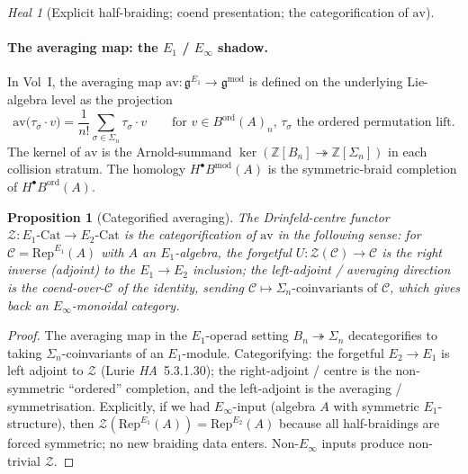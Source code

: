 \documentclass[11pt]{article}
\newtheorem{prop}[thm]{Proposition}
\theoremstyle{definition}
\theoremstyle{remark}
\newtheorem{heal}[thm]{Heal}
\newcommand{\bZ}{\mathbb{Z}}
\newcommand{\cC}{\mathcal{C}}
\newcommand{\cZ}{\mathcal{Z}}
\newcommand{\fg}{\mathfrak{g}}
\newcommand{\Rep}{\mathrm{Rep}}
\newcommand{\Eone}{E_1}
\newcommand{\Etwo}{E_2}
\newcommand{\Einf}{E_\infty}
\newcommand{\ord}{\mathrm{ord}}
\newcommand{\av}{\mathrm{av}}
\begin{document}
\begin{heal}[Explicit half-braiding; coend presentation; the
categorification of $\av$]
\paragraph{The averaging map: the $\Eone$ / $\Einf$ shadow.}
In Vol~I, the averaging map $\av\colon \fg^{\Eone} \to
\fg^{\mathrm{mod}}$ is defined on the underlying Lie-algebra level
as the projection
\[
\av\bigl(\tau_\sigma \cdot v\bigr) = \frac{1}{n!} \sum_{\sigma \in \Sigma_n} \tau_\sigma \cdot v
\qquad
\text{for $v \in B^{\ord}(A)_n$, $\tau_\sigma$ the ordered
permutation lift.}
\]
The kernel of $\av$ is the Arnold-summand
$\ker(\bZ[B_n] \twoheadrightarrow \bZ[\Sigma_n])$ in each
collision stratum. The homology $H^\bullet B^{\mathrm{mod}}(A)$
is the symmetric-braid completion of $H^\bullet B^{\ord}(A)$.

\begin{prop}[Categorified averaging]
\label{prop:cat-av}
The Drinfeld-centre functor
$\cZ\colon \Eone\text{-}\mathrm{Cat} \to \Etwo\text{-}\mathrm{Cat}$
is the categorification of $\av$ in the following sense: for
$\cC = \Rep^{\Eone}(A)$ with $A$ an $\Eone$-algebra, the forgetful
$U\colon \cZ(\cC) \to \cC$ is the \emph{right} inverse (adjoint)
to the $\Eone \to \Etwo$ inclusion; the left-adjoint / averaging
direction is the coend-over-$\cC$ of the identity, sending
$\cC \mapsto \Sigma_n\text{-coinvariants of }\cC$, which gives
back an $\Einf$-monoidal category.
\end{prop}

\begin{proof}
The averaging map in the $\Eone$-operad setting
$B_n \twoheadrightarrow \Sigma_n$ decategorifies to taking
$\Sigma_n$-coinvariants of an $\Eone$-module. Categorifying:
the forgetful $\Etwo \to \Eone$ is left adjoint to $\cZ$ (Lurie
\emph{HA}~5.3.1.30); the right-adjoint / centre is the
non-symmetric ``ordered'' completion, and the left-adjoint is the
averaging / symmetrisation. Explicitly, if we had $\Einf$-input
(algebra $A$ with symmetric $\Eone$-structure), then
$\cZ(\Rep^{\Eone}(A)) = \Rep^{\Etwo}(A)$ because all half-braidings
are forced symmetric; no new braiding data enters. Non-$\Einf$
inputs produce non-trivial $\cZ$.
\end{proof}


\end{heal}
\end{document}
